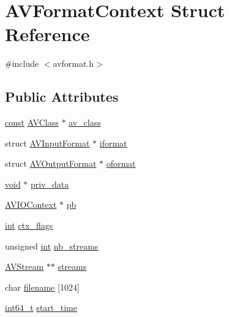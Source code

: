 \hypertarget{struct_a_v_format_context}{}\section{A\+V\+Format\+Context Struct Reference}
\label{struct_a_v_format_context}


{\ttfamily \#include $<$avformat.\+h$>$}

\subsection*{Public Attributes}
\begin{DoxyCompactItemize}
\item 
\hyperlink{getopt1_8c_a2c212835823e3c54a8ab6d95c652660e}{const} \hyperlink{struct_a_v_class}{A\+V\+Class} $\ast$ \hyperlink{struct_a_v_format_context_a0c396740b9a2487aa57d4352d2dc1687}{av\+\_\+class}
\item 
struct \hyperlink{struct_a_v_input_format}{A\+V\+Input\+Format} $\ast$ \hyperlink{struct_a_v_format_context_a78efc5a53c21c8d81197445207ac4374}{iformat}
\item 
struct \hyperlink{struct_a_v_output_format}{A\+V\+Output\+Format} $\ast$ \hyperlink{struct_a_v_format_context_a20d80ac07e38ff5c268d15aaf2798b98}{oformat}
\item 
\hyperlink{sound_8c_ae35f5844602719cf66324f4de2a658b3}{void} $\ast$ \hyperlink{struct_a_v_format_context_ac4c0777e54085af2f3f1b27130e2b21b}{priv\+\_\+data}
\item 
\hyperlink{struct_a_v_i_o_context}{A\+V\+I\+O\+Context} $\ast$ \hyperlink{struct_a_v_format_context_a1e7324262b6b78522e52064daaa7bc87}{pb}
\item 
\hyperlink{xmltok_8h_a5a0d4a5641ce434f1d23533f2b2e6653}{int} \hyperlink{struct_a_v_format_context_a4e6076343df1ffc2e16cedbba3f3f397}{ctx\+\_\+flags}
\item 
unsigned \hyperlink{xmltok_8h_a5a0d4a5641ce434f1d23533f2b2e6653}{int} \hyperlink{struct_a_v_format_context_a0b748d924898b08b89ff4974afd17285}{nb\+\_\+streams}
\item 
\hyperlink{struct_a_v_stream}{A\+V\+Stream} $\ast$$\ast$ \hyperlink{struct_a_v_format_context_acfefb6b6cf21e87a0dcbd1a547ba2348}{streams}
\item 
char \hyperlink{struct_a_v_format_context_a65a978cf0ca3c0f0da52840d2e97f9ea}{filename} \mbox{[}1024\mbox{]}
\item 
\hyperlink{lib-src_2ffmpeg_2win32_2stdint_8h_a67a9885ef4908cb72ce26d75b694386c}{int64\+\_\+t} \hyperlink{struct_a_v_format_context_a2590129e00adfa726ab2033a10e905e9}{start\+\_\+time}
$$
\end{DoxyCompactItemize}
